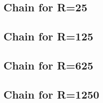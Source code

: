 \subsection{} %
\label{sec:filter_frequency_responses:cfir125}

%
%
\subsection{Chain for R=25} %
\label{sec:filter_frequency_responses:chain25}

%
%
\subsection{Chain for R=125} %
\label{sec:filter_frequency_responses:chain125}

%
%
\subsection{Chain for R=625} %
\label{sec:filter_frequency_responses:chain625}

%
%
\subsection{Chain for R=1250} %
\label{sec:filter_frequency_responses:chain1250}

%
%

